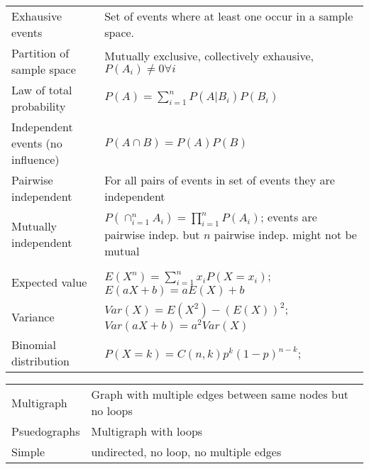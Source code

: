 \documentclass[a4paper,landscape]{article}
\begin{document}
\begin{multicols*}{2}
\begin{tabularx}{\columnwidth}{@{}lX@{}}
        Exhausive events                           & Set of events where at least one occur in a sample space.                                                            \\
        Partition of sample space                  & Mutually exclusive, collectively exhausive, $P(A_i) \neq 0 \forall i$                                                \\
        Law of total probability                   & $P(A) = \sum_{i=1}^n P(A|B_i)P(B_i)$                                                                                 \\
        Independent events (no influence)          & $P(A \cap B) = P(A)P(B)$                                                                                             \\
        Pairwise independent                       & For all pairs of events in set of events they are independent                                                        \\
        Mutually independent                       & $P(\cap_{i=1}^n A_i) = \prod_{i=1}^n P(A_i)$; events are pairwise indep. but $n$ pairwise indep. might not be mutual \\
        \\
        Expected value                             & $E(X^n) = \sum_{i=1}^n x_i P(X=x_i)$; $E(aX+b) = aE(X)+b$                                                            \\
        Variance                                   & $Var(X) = E(X^2) - (E(X))^2$; $Var(aX+b) = a^2Var(X)$                                                                \\
        Binomial distribution                      & $P(X=k) = C(n,k)p^k(1-p)^{n-k}$;                                                                                     \\
    \end{tabularx}
    \begin{tabularx}{\columnwidth}{@{}lX@{}}
        Multigraph                       & Graph with multiple edges between same nodes but no loops                                                \\
        Psuedographs                     & Multigraph with loops                                                                                    \\
        Simple                           & undirected, no loop, no multiple edges                                                                   \\

\end{tabularx}
\end{multicols*}
\end{document}
